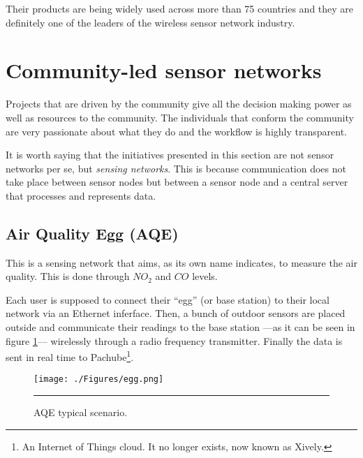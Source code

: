 Their products are being widely used across more than 75 countries and they are definitely one of the leaders of the wireless sensor network industry.


\section{Community-led sensor networks}

Projects that are driven by the community give all the decision making power as well as resources to the community. The individuals that conform the community are very passionate about what they do and the workflow is highly transparent.

It is worth saying that the initiatives presented in this section are not sensor networks per se, but \emph{sensing networks}. This is because communication does not take place between sensor nodes but between a sensor node and a central server that processes and represents data.

\subsection{Air Quality Egg (AQE)}

This is a sensing network that aims, as its own name indicates, to measure the air quality. This is done through $NO_{2}$ and $CO$ levels.

Each user is supposed to connect their ``egg'' (or base station) to their local network via an Ethernet inferface. Then, a bunch of outdoor sensors are placed outside and communicate their readings to the base station ---as it can be seen in figure \ref{fig:aqe}--- wirelessly through a radio frequency transmitter. Finally the data is sent in real time to Pachube\footnote{An Internet of Things cloud. It no longer exists, now known as Xively.}.

\begin{figure}[htbp]
    \centering
    \texttt{[image: ./Figures/egg.png]}
        \rule{35em}{0.5pt}
        \caption[Air Quality Egg typical scenario]{AQE typical scenario.}
    \label{fig:aqe}
\end{figure}

